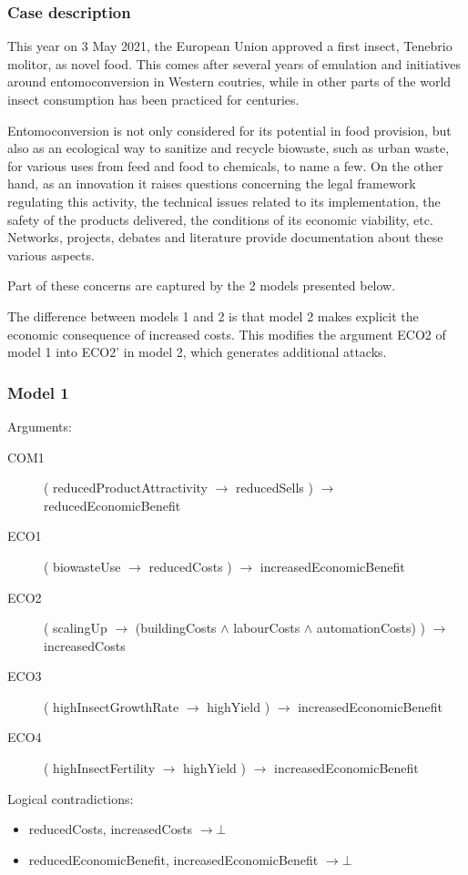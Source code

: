 \documentclass[version=3.21, pagesize, twoside=off, bibliography=totoc, DIV=calc, fontsize=12pt, a4paper, french, english]{scrartcl}
\begin{document}
\subsubsection{Case description}
This year on 3 May 2021, the European Union approved a first insect, Tenebrio molitor, as novel food. This comes after several years of emulation and initiatives around entomoconversion in Western coutries, while in other parts of the world insect consumption has been practiced for centuries.

Entomoconversion is not only considered for its potential in food provision, but also as an ecological way to sanitize and recycle biowaste, such as urban waste, for various uses from feed and food to chemicals, to name a few. On the other hand, as an innovation it raises questions concerning the legal framework regulating this activity, the technical issues related to its implementation, the safety of the products delivered, the conditions of its economic viability, etc. Networks, projects, debates and literature provide documentation about these various aspects.

Part of these concerns are captured by the 2 models presented below.

The difference between models 1 and 2 is that model 2 makes explicit the economic consequence of increased costs. This modifies the argument ECO2 of model 1 into ECO2’ in model 2, which generates additional attacks.

\subsubsection{Model 1}
Arguments:
\begin{description}
	\item[COM1] ( reducedProductAttractivity $→$ reducedSells )  $→$  reducedEconomicBenefit
	\item[ECO1] ( biowasteUse $→$ reducedCosts )  $→$  increasedEconomicBenefit
	\item[ECO2] ( scalingUp $→$ (buildingCosts $\land$ labourCosts $\land$ automationCosts) )  $→$  increasedCosts
	\item[ECO3] ( highInsectGrowthRate $→$ highYield )  $→$  increasedEconomicBenefit
	\item[ECO4] ( highInsectFertility $→$ highYield )  $→$  increasedEconomicBenefit
\end{description}

Logical contradictions:
\begin{itemize}
	\item reducedCosts, increasedCosts $→ ⊥$
	\item reducedEconomicBenefit, increasedEconomicBenefit $→ ⊥$
\end{itemize}
\end{document}
